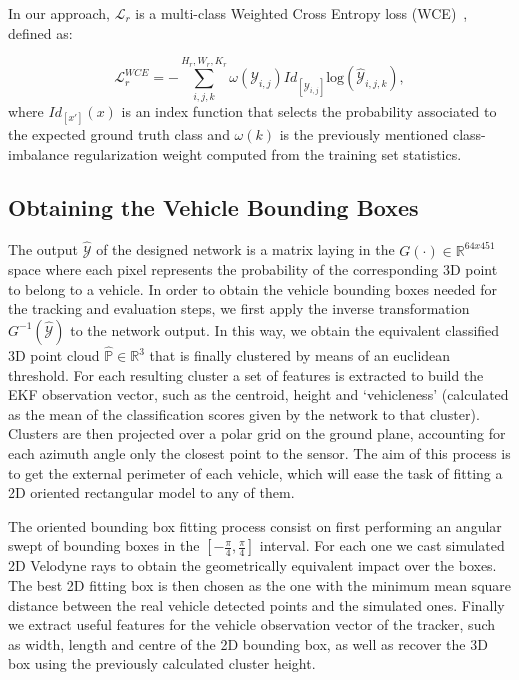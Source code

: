 \documentclass[letterpaper, 10 pt, conference]{ieeeconf}  %
\begin{document}
In our approach, $\mathcal{L}_r$ is a multi-class Weighted Cross Entropy loss (WCE)~\cite{RosArxiv16}, defined as:

\vspace{-5mm}\begin{equation}
\mathcal{L}_{r}^{WCE} = -\sum_{i,j,k}^{H_r,W_r,K_r} \omega(\mathcal{Y}_{i,j}) \textit{Id}_{[\mathcal{Y}_{i,j}]} \text{log}(\hat{\mathcal{Y}}_{i,j,k}), 
\label{eq:2}
\end{equation}\noindent where $\textit{Id}_{[x']}(x)$ is an index function that selects the probability associated to the expected ground truth class and $\omega(k)$ is the previously mentioned class-imbalance regularization weight computed from the training set statistics. 

\subsection{Obtaining the Vehicle Bounding Boxes}\label{sec:bbs}

The output $\hat{\mathcal{Y}}$ of the designed network is a matrix laying in the $G(\cdot) \in \mathbb{R}^{64x451}$ space where each pixel represents the probability of the corresponding 3D point to belong to a vehicle. 
In order to obtain the vehicle bounding boxes needed for the tracking and evaluation steps, we first apply the inverse transformation $G^{-1}(\hat{\mathcal{Y}})$ to the network output. In this way, we obtain the equivalent classified 3D point cloud $\mathbb{\hat{P}} \in \mathbb{R}^3$ that is finally clustered by means of an euclidean threshold. 
For each resulting cluster a set of features is extracted to build the EKF observation vector, such as the centroid, height and `vehicleness' (calculated as the mean of the classification scores given by the network to that cluster).
Clusters are then projected over a polar grid on the ground plane, accounting for each azimuth angle only the closest point to the sensor. The aim of this process is to get the external perimeter of each vehicle, which will ease the task of fitting a 2D oriented rectangular model to any of them.

The oriented bounding box fitting process consist on first performing an angular swept of bounding boxes in the $[-\frac{\pi}{4}, \frac{\pi}{4}]$ interval. For each one we cast simulated 2D Velodyne rays to obtain the geometrically equivalent impact over the boxes. The best 2D fitting box is then chosen as the one with the minimum mean square distance between the real vehicle detected points and the simulated ones.
Finally we extract useful features for the vehicle observation vector of the tracker, such as width, length and centre of the 2D bounding box, as well as recover the 3D box using the previously calculated cluster height. 
\end{document}
